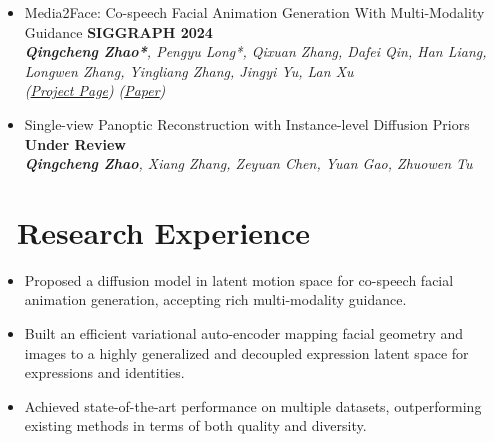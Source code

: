 \documentclass{resume}
\begin{document}
\begin{itemize}
  \item {\small \cite{zhao2024media2face} Media2Face: Co-speech Facial Animation Generation With Multi-Modality Guidance} \hfill{\textbf{SIGGRAPH 2024}}\\
        \textit{\footnotesize \textbf{Qingcheng Zhao*}, Pengyu Long*, Qixuan Zhang, Dafei Qin, Han Liang, Longwen Zhang, Yingliang Zhang, Jingyi Yu, Lan Xu}\\
        \textit{(\href{https://sites.google.com/view/media2face}{Project Page})}
        \textit{(\href{https://dl.acm.org/doi/10.1145/3641519.3657413}{Paper})}
      
  \item {Single-view Panoptic Reconstruction with Instance-level Diffusion Priors} \hfill{\textbf{Under Review}}\\
        \textit{\small \textbf{Qingcheng Zhao}, Xiang Zhang, Zeyuan Chen, Yuan Gao, Zhuowen Tu}

\end{itemize}


\section{\faFlask\ Research Experience}



\begin{itemize}
  \item Proposed a diffusion model in latent motion space for co-speech facial animation generation, accepting rich multi-modality guidance.
  \item Built an efficient variational auto-encoder mapping facial geometry and images to a highly generalized and decoupled expression latent space for expressions and identities.
  \item Achieved state-of-the-art performance on multiple datasets, outperforming existing methods in terms of both quality and diversity.
\end{itemize}
\end{document}
